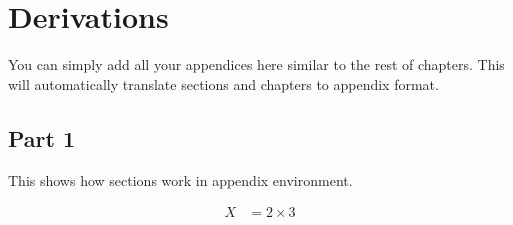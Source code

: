 \chapter{Derivations}

You can simply add all your appendices here similar to the rest of chapters. This will automatically translate sections and chapters to appendix format.

\section{Part 1}
This shows how sections work in  appendix  environment.

\begin{align}
	X & = 2 \times 3
\end{align}